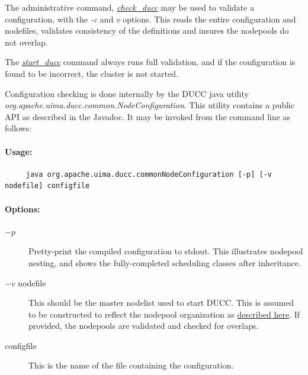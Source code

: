 The administrative command, \hyperref[subsec:admin.check-ducc]{\em check\_ducc} may be used to
validate a configuration, with the {\em -c} and {\em v} options.  This reads the entire configuration and
nodefiles, validates consistency of the definitions and insures the nodepools do not overlap.

The \hyperref[subsec:admin.start-ducc]{\em start\_ducc} command always runs full validation, and if the
configuration is found to be incorrect, the cluster is not started.

Configuration checking is done internally by the DUCC java utility {\em
  org.apache.uima.ducc.common.NodeConfiguration}.  This utility contains a public
API as described in the Javadoc.  It may be invoked from the command line as follows:

    \paragraph{Usage:}
\begin{verbatim}
     java org.apache.uima.ducc.commonNodeConfiguration [-p] [-v nodefile] configfile
\end{verbatim}

    \paragraph{Options:}
    \begin{description}

      \item[$-p$] Pretty-print the compiled configuration to stdout. This illustrates
        nodepool nesting, and shows the fully-completed scheduling classes after inheritance.

      \item[$-v$ nodefile] This should be the master nodelist used to start DUCC.  This
        is assumed to be constructed to reflect the nodepool organization as 
        \hyperref[sec:admin-ducc.nodes]{described here}.  If provided,
        the nodepools are validated and checked for overlaps.

      \item[configfile] This is the name of the file containing the configuration.
    \end{description}
    
